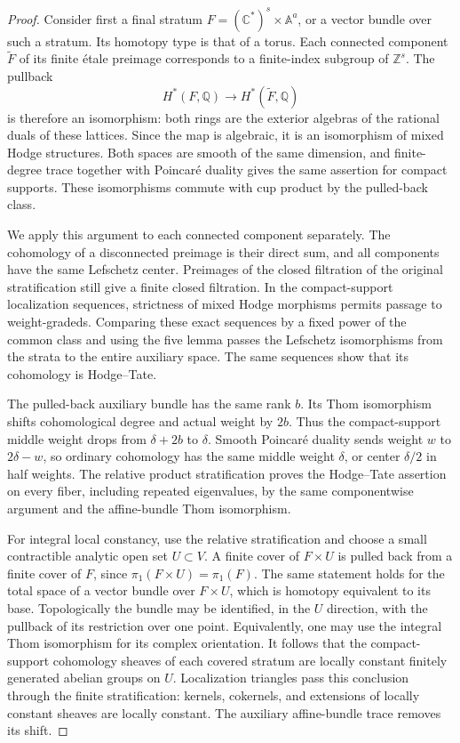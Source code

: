 \begin{proof}
Consider first a final stratum $F=(\mathbb C^*)^s\times\mathbb A^a$,
or a vector bundle over such a stratum.  Its homotopy type is that of
a torus.  Each connected component $\widetilde F$ of its finite \'etale
preimage corresponds to a finite-index subgroup of $\mathbb Z^s$.
The pullback
\[
 H^*(F,\mathbb Q)\longrightarrow H^*(\widetilde F,\mathbb Q)
\]
is therefore an isomorphism: both rings are the exterior algebras of
the rational duals of these lattices.  Since the map is algebraic, it
is an isomorphism of mixed Hodge structures.  Both spaces are smooth
of the same dimension, and finite-degree trace together with
Poincar\'e duality gives the same assertion for compact supports.
These isomorphisms commute with cup product by the pulled-back class.

We apply this argument to each connected component separately.
The cohomology of a disconnected preimage is their direct sum, and
all components have the same Lefschetz center.  Preimages of the closed
filtration of the original stratification still give a finite closed
filtration.  In the compact-support localization sequences, strictness
of mixed Hodge morphisms \cite[Theorem~2.3.5]{Deligne1971} permits
passage to weight-gradeds.  Comparing
these exact sequences by a fixed power of the common class and using
the five lemma passes the Lefschetz isomorphisms from the strata to
the entire auxiliary space.  The same sequences show that its
cohomology is Hodge--Tate.

The pulled-back auxiliary bundle has the same rank $b$.  Its Thom
isomorphism shifts cohomological degree and actual weight by $2b$.
Thus the compact-support middle weight drops from $\delta+2b$ to
$\delta$.  Smooth Poincar\'e duality sends weight $w$ to
$2\delta-w$, so ordinary cohomology has the same middle weight
$\delta$, or center $\delta/2$ in half weights.  The relative product
stratification proves the Hodge--Tate assertion on every fiber,
including repeated eigenvalues, by the same componentwise argument
and the affine-bundle Thom isomorphism.

For integral local constancy, use the relative stratification and
choose a small contractible analytic open set $U\subset V$.
A finite cover of $F\times U$ is pulled back from a finite cover of
$F$, since $\pi_1(F\times U)=\pi_1(F)$.  The same statement holds for
the total space of a vector bundle over $F\times U$, which is homotopy
equivalent to its base.  Topologically the bundle may be identified,
in the $U$ direction, with the pullback of its restriction over one
point.  Equivalently, one may use the integral Thom isomorphism for
its complex orientation.  It follows that the compact-support
cohomology sheaves of each covered stratum are locally constant
finitely generated abelian groups on $U$.  Localization triangles
pass this conclusion through the finite stratification: kernels,
cokernels, and extensions of locally constant sheaves are locally
constant.  The auxiliary affine-bundle trace removes its shift.


\end{proof}
